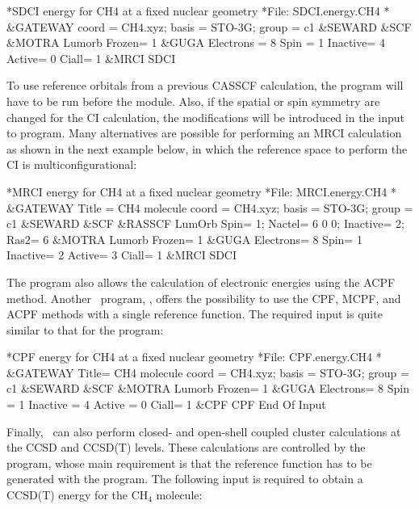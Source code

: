 \begin{inputlisting}
*SDCI energy for CH4 at a fixed nuclear geometry
*File: SDCI.energy.CH4
*
&GATEWAY
 coord = CH4.xyz; basis = STO-3G; group = c1
&SEWARD
&SCF
&MOTRA
 Lumorb
 Frozen= 1
&GUGA 
 Electrons = 8
 Spin = 1
 Inactive= 4
 Active= 0
 Ciall= 1
&MRCI 
 SDCI
\end{inputlisting}

To use reference orbitals from a previous CASSCF calculation, the
 program will have to be run before the 
module. Also, if the spatial or spin symmetry are changed for the CI
calculation, the modifications will be introduced in the input to  program.
Many alternatives are possible for performing an MRCI calculation as shown in the next example below,
in which the reference space to perform the CI is multiconfigurational:

\begin{inputlisting}
*MRCI energy for CH4 at a fixed nuclear geometry
*File: MRCI.energy.CH4
*
&GATEWAY
 Title = CH4 molecule
 coord = CH4.xyz; basis = STO-3G; group = c1
&SEWARD
&SCF
&RASSCF
 LumOrb
 Spin= 1; Nactel= 6 0 0; Inactive= 2; Ras2= 6
&MOTRA 
 Lumorb
 Frozen= 1
&GUGA
 Electrons= 8
 Spin= 1
 Inactive= 2
 Active= 3
 Ciall= 1
&MRCI
 SDCI
\end{inputlisting}

The  program also allows the calculation of electronic energies using the
ACPF method. Another \molcas\ program, , offers the possibility to 
use the CPF, MCPF, and ACPF methods with a single reference function. The 
required input is quite similar to that for the  program:

\begin{inputlisting}
*CPF energy for CH4 at a fixed nuclear geometry
*File: CPF.energy.CH4
*
&GATEWAY
 Title= CH4 molecule
 coord = CH4.xyz; basis = STO-3G; group = c1
&SEWARD
&SCF 
&MOTRA 
 Lumorb
 Frozen= 1
&GUGA
 Electrons= 8
 Spin = 1
 Inactive = 4
 Active = 0
 Ciall= 1
&CPF
 CPF
End Of Input
\end{inputlisting}

Finally, \molcas\ can also perform closed- and open-shell coupled cluster
calculations at the CCSD and CCSD(T) levels. These calculations are controlled by
the  program, whose main requirement is that the reference 
function has to be generated with the  program. The following input is 
required to obtain a CCSD(T) energy for the CH$_4$ molecule:

